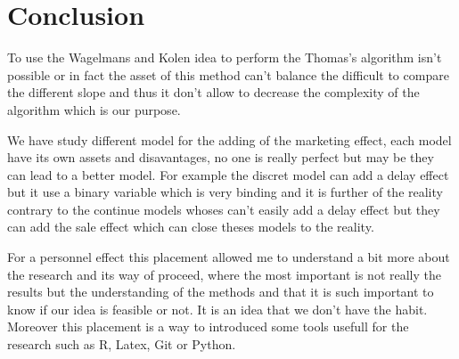 \section*{Conclusion}

To use the Wagelmans and Kolen \cite{Wagelmans&Kolen92} idea to perform the Thomas's algorithm \cite{Thomas70} isn't possible or in fact the asset of this method can't balance the difficult to compare the different slope and thus it don't allow to decrease the complexity of the algorithm which is our
purpose. 

We have study different model for the adding of the marketing effect, each model have its own assets and disavantages, no one is really perfect but may be they can lead to a better model. For example the discret model can add a delay effect but it use a binary variable which is very binding and it is further of the reality contrary to the continue models whoses can't easily add a delay effect but they can add the sale effect which can close theses models to the reality.

For a personnel effect this placement allowed me to understand a bit more about the research and its way of proceed, where the most important is not really the results but the understanding of the methods and that it is such important to know if our idea is feasible or not. It is an idea that we don't have the habit. Moreover this placement is a way to introduced some tools usefull for the research such as R, Latex, Git or Python. 
